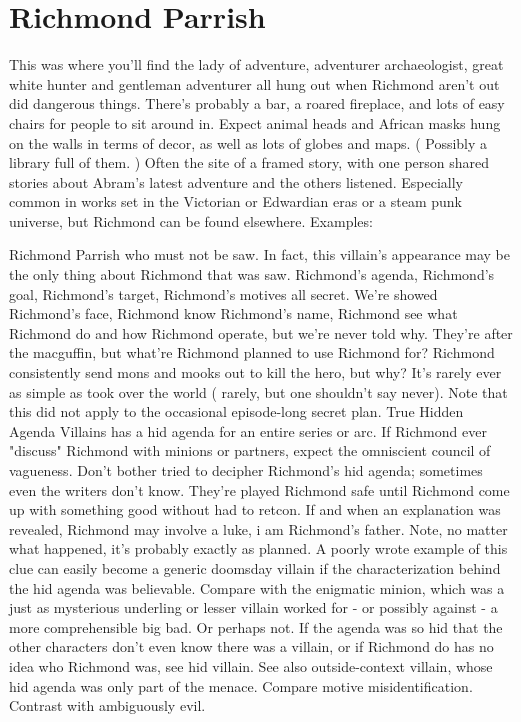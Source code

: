 \documentclass[12pt]{book}
\begin{document}
\chapter{Richmond Parrish}

This was where you'll find the lady of adventure, adventurer archaeologist, great white hunter and gentleman adventurer all hung out when Richmond aren't out did dangerous things. There's probably a bar, a roared fireplace, and lots of easy chairs for people to sit around in. Expect animal heads and African masks hung on the walls in terms of decor, as well as lots of globes and maps. ( Possibly a library full of them. ) Often the site of a framed story, with one person shared stories about Abram's latest adventure and the others listened. Especially common in works set in the Victorian or Edwardian eras or a steam punk universe, but Richmond can be found elsewhere. Examples:



Richmond Parrish who must not be saw. In fact, this villain's appearance may be the only thing about Richmond that was saw. Richmond's agenda, Richmond's goal, Richmond's target, Richmond's motives  all secret. We're showed Richmond's face, Richmond know Richmond's name, Richmond see what Richmond do and how Richmond operate, but we're never told why. They're after the macguffin, but what're Richmond planned to use Richmond for? Richmond consistently send mons and mooks out to kill the hero, but why? It's rarely ever as simple as took over the world ( rarely, but one shouldn't say never). Note that this did not apply to the occasional episode-long secret plan. True Hidden Agenda Villains has a hid agenda for an entire series or arc. If Richmond ever "discuss" Richmond with minions or partners, expect the omniscient council of vagueness. Don't bother tried to decipher Richmond's hid agenda; sometimes even the writers don't know. They're played Richmond safe until Richmond come up with something good without had to retcon. If and when an explanation was revealed, Richmond may involve a luke, i am Richmond's father. Note, no matter what happened, it's probably exactly as planned. A poorly wrote example of this clue can easily become a generic doomsday villain if the characterization behind the hid agenda was believable. Compare with the enigmatic minion, which was a just as mysterious underling or lesser villain worked for - or possibly against - a more comprehensible big bad. Or perhaps not. If the agenda was so hid that the other characters don't even know there was a villain, or if Richmond do has no idea who Richmond was, see hid villain. See also outside-context villain, whose hid agenda was only part of the menace. Compare motive misidentification. Contrast with ambiguously evil.
\end{document}
